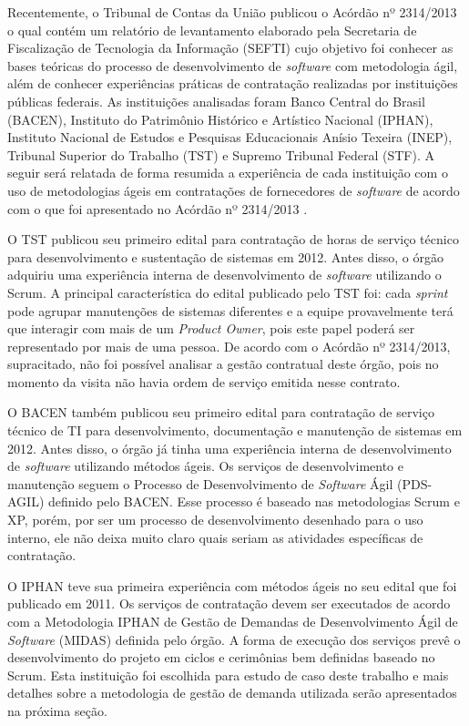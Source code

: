 Recentemente, o Tribunal de Contas da União publicou o Acórdão nº 2314/2013 o qual contém um relatório de levantamento elaborado pela Secretaria de Fiscalização de Tecnologia da Informação (SEFTI) cujo objetivo foi conhecer as bases teóricas do processo de desenvolvimento de \textit{software} com metodologia ágil, além de conhecer experiências práticas de contratação realizadas por instituições públicas federais. As instituições analisadas foram Banco Central do Brasil (BACEN), Instituto do Patrimônio Histórico e Artístico Nacional (IPHAN), Instituto Nacional de Estudos e Pesquisas Educacionais Anísio Texeira (INEP), Tribunal Superior do Trabalho (TST) e Supremo Tribunal Federal (STF). A seguir será relatada de forma resumida a experiência de cada instituição com o uso de metodologias ágeis em contratações de fornecedores de \textit{software} de acordo com o que foi apresentado no Acórdão nº 2314/2013 \cite{TCU:2013}.

O TST publicou seu primeiro edital para contratação de horas de serviço técnico para desenvolvimento e sustentação de sistemas em 2012. Antes disso, o órgão adquiriu uma experiência interna de desenvolvimento de \textit{software} utilizando o Scrum. A principal característica do edital publicado pelo TST foi: cada \textit{sprint} pode agrupar manutenções de sistemas diferentes e a equipe provavelmente terá que interagir com mais de um \textit{Product Owner}, pois este papel poderá ser representado por mais de uma pessoa. De acordo com o Acórdão nº 2314/2013, supracitado, não foi possível analisar a gestão contratual deste órgão, pois no momento da visita não havia ordem de serviço emitida nesse contrato.

O BACEN também publicou seu primeiro edital para contratação de serviço técnico de TI para desenvolvimento, documentação e manutenção de sistemas em 2012. Antes disso, o órgão já tinha uma experiência interna de desenvolvimento de \textit{software} utilizando métodos ágeis. Os serviços de desenvolvimento e manutenção seguem o Processo de Desenvolvimento de \textit{Software} Ágil (PDS-AGIL) definido pelo BACEN. Esse processo é baseado nas metodologias Scrum e XP, porém, por ser um processo de desenvolvimento desenhado para o uso interno, ele não deixa muito claro quais seriam as atividades específicas de contratação. 

O IPHAN teve sua primeira experiência com métodos ágeis no seu edital que foi publicado em 2011. Os serviços de contratação devem ser executados de acordo com a Metodologia IPHAN de Gestão de Demandas de Desenvolvimento Ágil de \textit{Software} (MIDAS) definida pelo órgão. A forma de execução dos serviços prevê o desenvolvimento do projeto em ciclos e cerimônias bem definidas baseado no Scrum. Esta instituição foi escolhida para estudo de caso deste trabalho e mais detalhes sobre a metodologia de gestão de demanda utilizada serão apresentados na próxima seção. 

